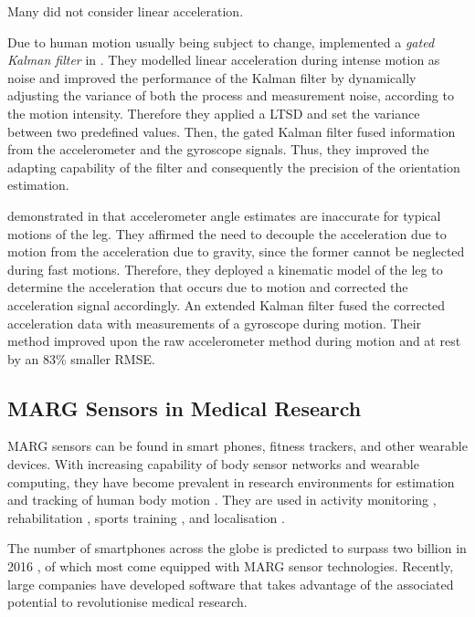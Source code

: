 Many did not consider linear acceleration.

Due to human motion usually being subject to change, \citeauthor{olivares_vicente_signal_2013} implemented a \emph{gated Kalman filter} in \cite{olivares_vicente_signal_2013}. They modelled linear acceleration during intense motion as noise and improved the performance of the Kalman filter by dynamically adjusting the variance of both the process and measurement noise, according to the motion intensity. Therefore they applied a \gls{LTSD} and set the variance between two predefined values. Then, the gated Kalman filter fused information from the accelerometer and the gyroscope signals. Thus, they improved the adapting capability of the filter and consequently the precision of the orientation estimation.

\citeauthor{bennett_motion_2014} demonstrated in \cite{bennett_motion_2014} that accelerometer angle estimates are inaccurate for typical motions of the leg. They affirmed the need to decouple the acceleration due to motion from the acceleration due to gravity, since the former cannot be neglected during fast motions. Therefore, they deployed a kinematic model of the leg to determine the acceleration that occurs due to motion and corrected the acceleration signal accordingly. An extended Kalman filter fused the corrected acceleration data with measurements of a gyroscope during motion. Their method improved upon the raw accelerometer method during motion and at rest by an 83\% smaller \gls{RMSE}.

\subsection{MARG Sensors in Medical Research}\label{sec:MARG_sensors_medical}

MARG sensors can be found in smart phones, fitness trackers, and other wearable devices. With increasing capability of body sensor networks and wearable computing, they have become prevalent in research environments for estimation and tracking of human body motion \cite{bennett_motion_2014}. They are used in activity monitoring \cite{veltink_detection_96}\cite{najafi_ambulatory_03}\cite{ermes_sports_08}, rehabilitation \cite{giggins_rehabilitation_13}\cite{lupinski_ligament_11}, sports training \cite{bonnet_squat_13}\cite{ermes_sports_08}, and localisation \cite{hoflinger_localization_13}\cite{Bennett_distance_13}.

The number of smartphones across the globe is predicted to surpass two billion in 2016 \cite{emarketer_smartphones}, of which most come equipped with MARG sensor technologies. Recently, large companies have developed software that takes advantage of the associated potential to revolutionise medical research.

